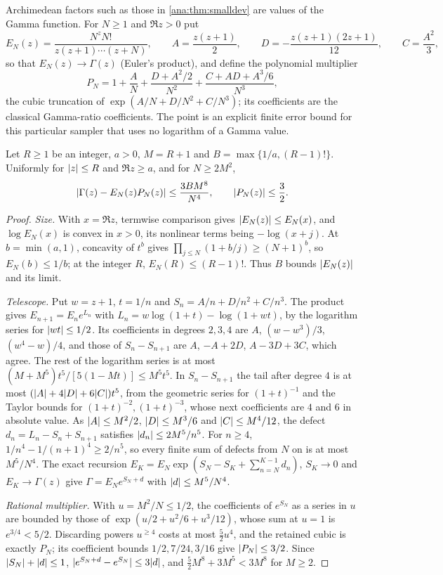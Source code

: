 Archimedean factors such as those in \cref{ana:thm:smalldev} are values of the Gamma function. For
$N\ge1$ and $\Re z>0$ put
\[
 E_N(z)=\frac{N^zN!}{z(z+1)\cdots(z+N)},\qquad A=\frac{z(z+1)}2,\qquad D=-\frac{z(z+1)(2z+1)}{12},\qquad
 C=\frac{A^2}3,
\]
so that $E_N(z)\to\Gamma(z)$ (Euler's product), and define the polynomial multiplier
\[
 P_N=1+\frac AN+\frac{D+A^2/2}{N^2}+\frac{C+AD+A^3/6}{N^3},
\]
the cubic truncation of $\exp(A/N+D/N^2+C/N^3)$; its coefficients are the classical Gamma-ratio
coefficients. The point is an explicit finite error bound for this particular sampler that uses no
logarithm of a Gamma value.

\begin{proposition}\label{ana:prop:eulergamma}
Let $R\ge1$ be an integer, $a>0$, $M=R+1$ and $B=\max\{1/a,(R-1)!\}$. Uniformly for $\lvert z\rvert\le R$ and
$\Re z\ge a$, and for $N\ge2M^2$,
\[
 \lvert\Gamma(z)-E_N(z)P_N(z)\rvert\le\frac{3BM^8}{N^4},\qquad\lvert P_N(z)\rvert\le\frac32 .
\]
\end{proposition}

\begin{proof}
\emph{Size.} With $x=\Re z$, termwise comparison gives $\lvert E_N(z)\rvert\le E_N(x)$, and $\log E_N(x)$ is
convex in $x>0$, its nonlinear terms being $-\log(x+j)$. At $b=\min(a,1)$, concavity of $t^b$ gives
$\prod_{j\le N}(1+b/j)\ge(N+1)^b$, so $E_N(b)\le1/b$; at the integer $R$, $E_N(R)\le(R-1)!$. Thus $B$
bounds $\lvert E_N(z)\rvert$ and its limit.

\emph{Telescope.} Put $w=z+1$, $t=1/n$ and $S_n=A/n+D/n^2+C/n^3$. The product gives $E_{n+1}=E_ne^{L_n}$
with $L_n=w\log(1+t)-\log(1+wt)$, by the logarithm series for $\lvert wt\rvert\le1/2$. Its coefficients in
degrees $2,3,4$ are $A$, $(w-w^3)/3$, $(w^4-w)/4$, and those of $S_n-S_{n+1}$ are $A$, $-A+2D$,
$A-3D+3C$, which agree. The rest of the logarithm series is at most
$(M+M^5)t^5/[5(1-Mt)]\le M^5t^5$. In $S_n-S_{n+1}$ the tail after degree $4$ is at most
$(\lvert A\rvert+4\lvert D\rvert+6\lvert C\rvert)t^5$, from the geometric series for $(1+t)^{-1}$ and the Taylor bounds for
$(1+t)^{-2},(1+t)^{-3}$, whose next coefficients are $4$ and $6$ in absolute value. As $\lvert A\rvert\le M^2/2$,
$\lvert D\rvert\le M^3/6$ and $\lvert C\rvert\le M^4/12$, the defect $d_n=L_n-S_n+S_{n+1}$ satisfies
$\lvert d_n\rvert\le2M^5/n^5$. For $n\ge4$, $1/n^4-1/(n+1)^4\ge2/n^5$, so every finite sum of defects from $N$
on is at most $M^5/N^4$. The exact recursion $E_K=E_N\exp(S_N-S_K+\sum_{n=N}^{K-1}d_n)$, $S_K\to0$ and
$E_K\to\Gamma(z)$ give $\Gamma=E_Ne^{S_N+d}$ with $\lvert d\rvert\le M^5/N^4$.

\emph{Rational multiplier.} With $u=M^2/N\le1/2$, the coefficients of $e^{S_N}$ as a series in $u$ are
bounded by those of $\exp(u/2+u^2/6+u^3/12)$, whose sum at $u=1$ is $e^{3/4}<5/2$. Discarding powers
$u^{\ge4}$ costs at most $\frac52u^4$, and the retained cubic is exactly $P_N$; its coefficient bounds
$1/2,7/24,3/16$ give $\lvert P_N\rvert\le3/2$. Since $\lvert S_N\rvert+\lvert d\rvert\le1$,
$\lvert e^{S_N+d}-e^{S_N}\rvert\le3\lvert d\rvert$, and $\frac52M^8+3M^5<3M^8$ for $M\ge2$.
\end{proof}

